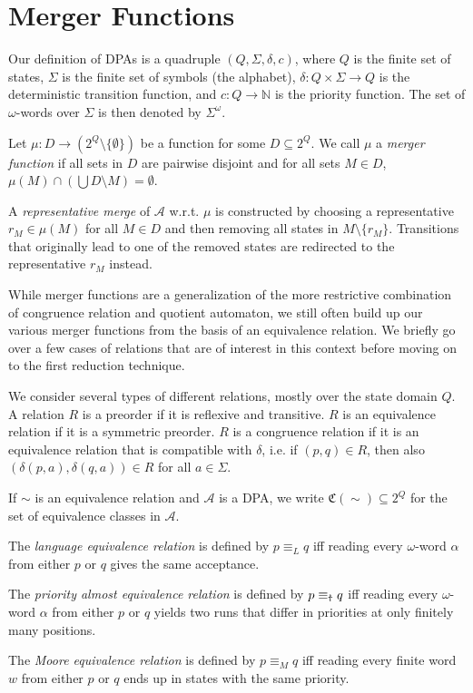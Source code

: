 \section{Merger Functions}
Our definition of DPAs is a quadruple $(Q, \Sigma, \delta, c)$, where $Q$ is the finite set of states, $\Sigma$ is the finite set of symbols (the alphabet), $\delta : Q \times \Sigma \rightarrow Q$ is the deterministic transition function, and $c : Q \rightarrow \mathbb{N}$ is the priority function. The set of $\omega$-words over $\Sigma$ is then denoted by $\Sigma^\omega$.

\begin{definition}
	Let $\mu : D \rightarrow (2^Q \setminus \{\emptyset\})$ be a function for some $D \subseteq 2^Q$. We call $\mu$ a \emph{merger function} if all sets in $D$ are pairwise disjoint and for all sets $M \in D$, $\mu(M) \cap (\bigcup D \setminus M) = \emptyset$.
	
	A \emph{representative merge} of $\mathcal{A}$ w.r.t. $\mu$ is constructed by choosing a representative $r_M \in \mu(M)$ for all $M \in D$ and then removing all states in $M \setminus \{r_M\}$. Transitions that originally lead to one of the removed states are redirected to the representative $r_M$ instead.
\end{definition}

While merger functions are a generalization of the more restrictive combination of congruence relation and quotient automaton, we still often build up our various merger functions from the basis of an equivalence relation. We briefly go over a few cases of relations that are of interest in this context before moving on to the first reduction technique.

We consider several types of different relations, mostly over the state domain $Q$. A relation $R$ is a preorder if it is reflexive and transitive. $R$ is an equivalence relation if it is a symmetric preorder. $R$ is a congruence relation if it is an equivalence relation that is compatible with $\delta$, i.e. if $(p, q) \in R$, then also $(\delta(p, a), \delta(q, a)) \in R$ for all $a \in \Sigma$.

If $\sim$ is an equivalence relation and $\mathcal{A}$ is a DPA, we write $\mathfrak{C}(\sim) \subseteq 2^Q$ for the set of equivalence classes in $\mathcal{A}$. 

\begin{definition}
	The \emph{language equivalence relation} is defined by $p \equiv_L q$ iff reading every $\omega$-word $\alpha$ from either $p$ or $q$ gives the same acceptance.
	
	The \emph{priority almost equivalence relation} is defined by $p \equiv_\text{\Ankh} q$ iff reading every $\omega$-word $\alpha$ from either $p$ or $q$ yields two runs that differ in priorities at only finitely many positions.
	
	The \emph{Moore equivalence relation} is defined by $p \equiv_M q$ iff reading every finite word $w$ from either $p$ or $q$ ends up in states with the same priority.
\end{definition}

